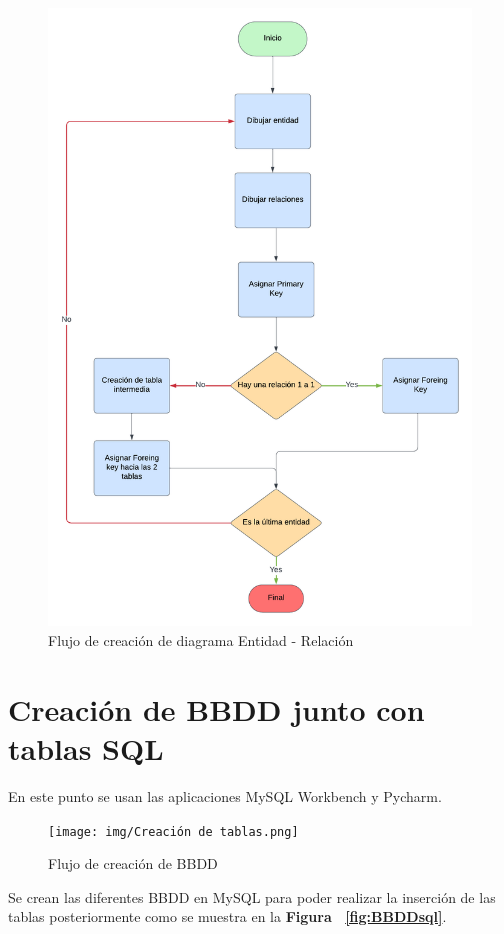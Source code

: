 \documentclass[a4paper, 12pt]{book}
\begin{document}
\begin{figure}
	\centering
	\includegraphics[width=15cm, keepaspectratio]{img/Creacion diagrama.png}
	\caption{Flujo de creación de diagrama Entidad - Relación}
	\label{fig:flujo creacion de diagrama}
\end{figure}

\section{Creación de BBDD junto con tablas SQL} 
\label{sec:creacion_BBDD}
En este punto se usan las aplicaciones MySQL Workbench y Pycharm.
\begin{figure}
	\centering
	\texttt{[image: img/Creación de tablas.png]}
	\caption{Flujo de creación de BBDD}
	\label{fig:flujo creacion BBDD}
\end{figure}
Se crean las diferentes BBDD en MySQL para poder realizar la inserción de las tablas posteriormente como se muestra en la \textbf {Figura ~\ref{fig:BBDDsql}}.
\end{document}
